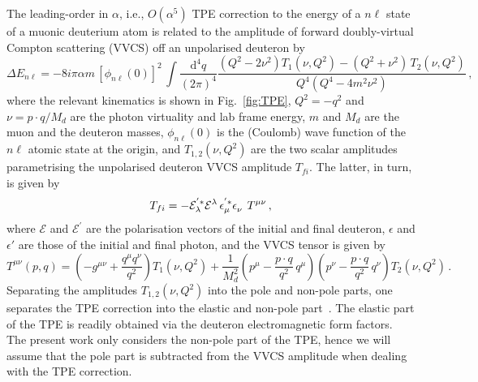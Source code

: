 \documentclass[prl,
twocolumn,
showpacs,preprintnumbers,amsmath,amssymb,
superscriptaddress,
a4paper,nofootinbib,longbibliography]{revtex4-2}
\def\beq{\begin{equation}}
\def\eeq{\end{equation}}
\def\al{\alpha}
\def\dd{\mathrm{d}}
\begin{document}
The leading-order in $\alpha$, i.e., $O(\alpha^5)$ TPE correction to the energy of a $n\ell$ state of a muonic deuterium atom is related to the amplitude of forward doubly-virtual Compton scattering (VVCS) off an unpolarised deuteron by~\cite{Carlson:2011zd,Carlson:2013xea}
\begin{equation}
\Delta E_{n\ell}= -8i\pi \al m \,\left[\phi_{n\ell}(0)\right]^2\,
\int \!\!\frac{\dd^4 q}{(2\pi)^4}   \frac{\left(Q^2-2\nu^2\right)T_1(\nu,Q^2)-(Q^2+\nu^2)\,T_2(\nu,Q^2)}{Q^4(Q^4-4m^2\nu^2)}\,,
\label{TPE_LS}
\end{equation}
where the relevant kinematics is shown in Fig.~\ref{fig:TPE}, $Q^2=-q^2$ and $\nu = p\cdot q/M_d$ are the photon virtuality and lab frame energy, $m$ and $M_d$ are the muon and the deuteron masses, $\phi_{n\ell}(0)$ is the (Coulomb) wave function of the $n\ell$ atomic state at the origin, and $T_{1,2}(\nu,Q^2)$ are the two scalar amplitudes parametrising the unpolarised deuteron VVCS amplitude $T_{fi}$. The latter, in turn, is given by
\beq
T_{fi}=-\mathcal{E}^{'*}_\lambda\mathcal{E}^\lambda\, \epsilon^{'*}_\mu \epsilon^{\textcolor{white}{'*}}_\nu\, T^{\mu\nu}\,,
\eeq
where $\mathcal{E}$ and $\mathcal{E}^{'}$ are the polarisation vectors of the initial and final
deuteron, $\epsilon$ and $\epsilon'$ are those of the initial and final photon, and the VVCS tensor
is given by
\beq 
T^{\mu\nu} (p,q) = \left( -g^{\mu\nu}+\frac{q^{\mu}q^{\nu}}{q^2}\right)
T_1(\nu, Q^2) +\frac{1}{M_d^2} \left(p^{\mu}-\frac{p\cdot
q}{q^2}\,q^{\mu}\right) \left(p^{\nu}-\frac{p\cdot
q}{q^2}\, q^{\nu} \right) T_2(\nu, Q^2)\,.
\label{eq:VVCS_amplitude}
\eeq
Separating the amplitudes $T_{1,2}(\nu,Q^2)$ into the pole and non-pole parts, one separates the TPE correction into the elastic and non-pole part~\cite{Carlson:2013xea}. The elastic part of the TPE is readily obtained via the deuteron electromagnetic form factors. The present work only considers the non-pole part of the TPE, hence we will assume that the pole part is subtracted from the VVCS amplitude when dealing with the TPE correction.
\end{document}
